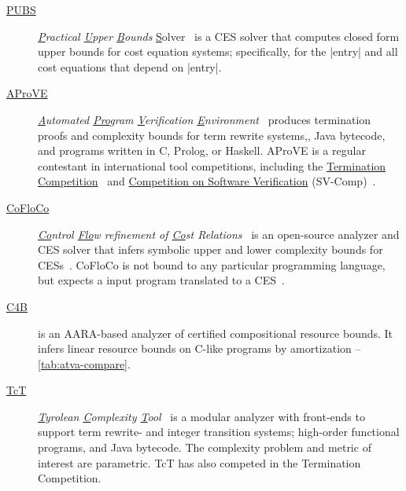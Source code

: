 \begin{description}

\item[\href{https://costa.fdi.ucm.es/~costa/pubs/pubs.php}{{PUBS}}]
      \emph{\underline{P}ractical \underline{U}pper \underline{B}ounds} \underline{S}olver~\cite{albert2010}
      is a CES solver that computes closed form upper bounds for cost equation systems;
      specifically, for the \pr|entry| and all cost equations that depend on \pr|entry|.

\item[\href{https://aprove.informatik.rwth-aachen.de}{{AProVE}}]
      \emph{\underline{A}utomated \underline{Pro}gram \underline{V}erification \underline{E}nvironment}~\cite{giesl2016}
      produces termination proofs and complexity bounds for
      term rewrite systems,,
      Java bytecode,
      and programs written in
      C,
      Prolog, or
      Haskell.
      AProVE is a regular contestant in international tool competitions, including the
      \href{https://termination-portal.org/wiki/Termination_Competition}{Termination Competition}~\cite{giesl2019}
      and \href{https://sv-comp.sosy-lab.org}{Competition on Software Verification} (SV-Comp)~\cite{beyer2022}.

\item[\href{https://github.com/aeflores/CoFloCo}{{CoFloCo}}]
      \emph{\underline{Co}ntrol \underline{Flo}w refinement of \underline{Co}st Relations}~\cite{floresmontoya2014}
      is an open-source analyzer and CES solver that infers symbolic upper and lower complexity bounds for CESs~\cite{flores-montoya2016}.
      CoFloCo is not bound to any particular programming language, but expects a input program translated to a CES~\cite{flores2016}.

\item[\href{https://github.com/academic-archive/pldi15}{C4B}]\cite{carbonneaux2015}
      is an AARA-based analyzer of certified compositional resource bounds.
      It infers linear resource bounds on C-like programs by amortization -- \autoref{tab:atva-compare}.

\item[\href{http://cl-informatik.uibk.ac.at/software/tct/}{TcT}]
       \emph{\underline{T}yrolean \underline{C}omplexity \underline{T}ool}~\cite{avanzini2016}
       is a modular analyzer with front-ends to support term rewrite- and integer transition systems;
       high-order functional programs, and Java bytecode.
       The complexity problem and metric of interest are parametric.
       TcT has also competed in the Termination Competition.


\end{description}
